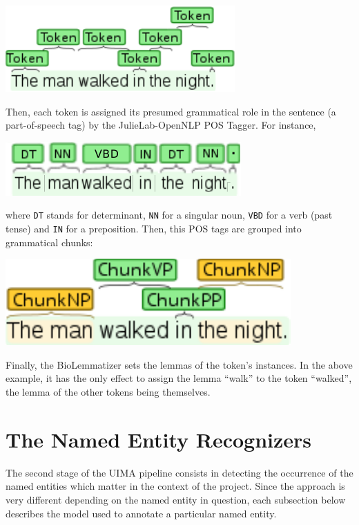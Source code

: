 \documentclass{report}
\begin{document}
                \begin{center}
					\includegraphics[width=.45\textwidth]{fig/brat_tokenizer_output.pdf}
				\end{center}
				Then, each token is assigned its presumed grammatical role in the sentence (a
				part-of-speech tag) by the JulieLab-OpenNLP POS Tagger. For instance,
				
				\begin{center}
					\includegraphics[width=.45\textwidth]{fig/brat_pos_tagger_output.pdf}
				\end{center} where \texttt{DT} stands for determinant, \texttt{NN} for a singular noun,
				\texttt{VBD} for a verb (past tense) and \texttt{IN} for a preposition. Then, this POS tags
				are grouped into grammatical chunks: 
				
				\begin{center}
					\includegraphics[width=.45\textwidth]{fig/brat_chunker_output.pdf}
				\end{center}
				Finally, the BioLemmatizer \cite{biolemmatizer} sets the lemmas of the token's instances. In the above example, it has the only effect to assign the lemma
				``walk'' to the token ``walked'', the lemma of the other tokens
				being themselves.
				
				\section{The Named Entity Recognizers}
				The second stage of the UIMA pipeline consists in detecting the occurrence
				of the named entities which matter in the context of the project. Since the
				approach is very different depending on the named entity in question, each
				subsection below describes the model used to annotate a particular named entity.
				
\end{document}
